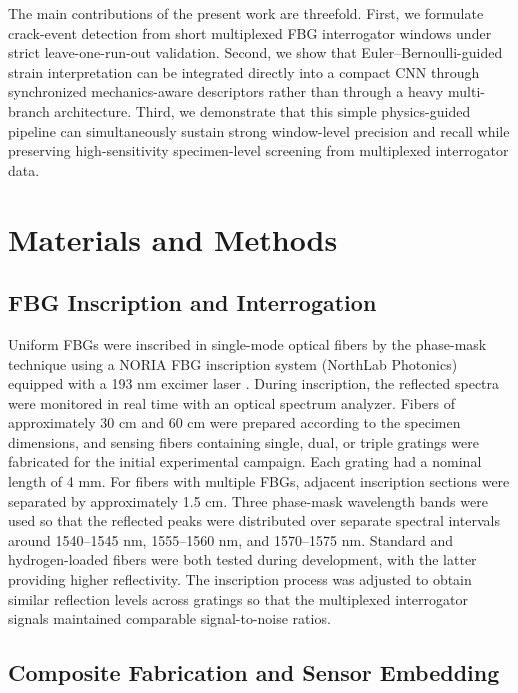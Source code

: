 \documentclass[notspecified,article,submit,pdftex,moreauthors]{Definitions/mdpi}
\begin{document}
The main contributions of the present work are threefold. First, we formulate crack-event detection from short multiplexed FBG interrogator windows under strict leave-one-run-out validation. Second, we show that Euler--Bernoulli-guided strain interpretation can be integrated directly into a compact CNN through synchronized mechanics-aware descriptors rather than through a heavy multi-branch architecture. Third, we demonstrate that this simple physics-guided pipeline can simultaneously sustain strong window-level precision and recall while preserving high-sensitivity specimen-level screening from multiplexed interrogator data.

\section{Materials and Methods}

\subsection{FBG Inscription and Interrogation}

Uniform FBGs were inscribed in single-mode optical fibers by the phase-mask technique using a NORIA FBG inscription system (NorthLab Photonics) equipped with a 193 nm excimer laser \cite{nieuwland2016}. During inscription, the reflected spectra were monitored in real time with an optical spectrum analyzer. Fibers of approximately 30 cm and 60 cm were prepared according to the specimen dimensions, and sensing fibers containing single, dual, or triple gratings were fabricated for the initial experimental campaign. Each grating had a nominal length of 4 mm. For fibers with multiple FBGs, adjacent inscription sections were separated by approximately 1.5 cm. Three phase-mask wavelength bands were used so that the reflected peaks were distributed over separate spectral intervals around 1540--1545 nm, 1555--1560 nm, and 1570--1575 nm. Standard and hydrogen-loaded fibers were both tested during development, with the latter providing higher reflectivity. The inscription process was adjusted to obtain similar reflection levels across gratings so that the multiplexed interrogator signals maintained comparable signal-to-noise ratios.

\subsection{Composite Fabrication and Sensor Embedding}
\end{document}

